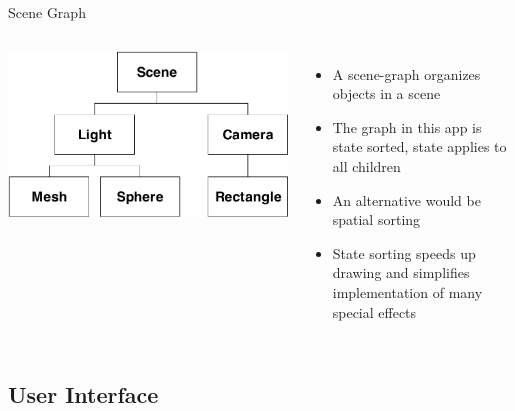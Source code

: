 \documentclass[12pt,ucs,hyperref={pdftext}]{beamer}
\newlength{\columnleft}
\newlength{\columnright}
\begin{document}
\begin{frame}{Scene Graph}
\begin{columns}

\column{\columnleft}
\includegraphics[width=\columnleft]{media/scene.pdf}

\column{\columnright}
\begin{itemize}%
\item A scene-graph organizes objects in a scene
\item The graph in this app is state sorted, state applies to all children
\item An alternative would be spatial sorting
\item State sorting speeds up drawing and simplifies implementation of many special effects
\end{itemize}

\end{columns}
\end{frame}


\subsection{User Interface}
\end{document}
